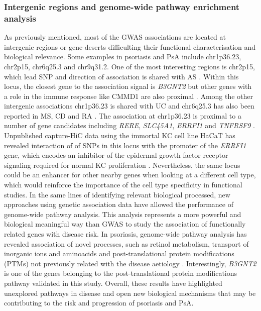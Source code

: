\subsubsection{Intergenic regions and genome-wide pathway enrichment analysis}
As previously mentioned, most of the GWAS associations are located at intergenic regions or gene deserts difficulting their functional characterisation and biological relevance. Some examples in psoriasis and PsA include chr1p36.23, chr2p15, chr6q25.3 and chr9q31.2. One of the most interesting regions is chr2p15, which lead SNP and direction of association is shared with AS \parencite{Immunobase}. Within this locus, the closest gene to the association signal is \textit{B3GNT2} but other genes with a role in the immune response like CMMD1 are also proximal \parencite{Maine2007}. Among the other intergenic associations chr1p36.23 is shared with UC and chr6q25.3 has also been reported in MS, CD and RA \parencite{Immunobase}. The association at chr1p36.23 is proximal to a number of gene candidates including \textit{RERE}, \textit{SLC45A1}, \textit{ERRFI1} and \textit{TNFRSF9} \parencite{Tsoi2012}. Unpublished capture-HiC data using the immortal KC cell line  HaCaT has revealed interaction of of SNPs in this locus with the promoter of the \textit{ERRFI1} gene, which encodes an inhibitor of the epidermal growth factor receptor signaling required for normal KC proliferation \parencite{Ray-Jones2017}. Nevertheless, the same locus could be an enhancer for other nearby genes when looking at a different cell type, which would reinforce the importance of the cell type specificity in functional studies. 
In the same lines of identifying relevant biological processed, new approaches using genetic association data have allowed the performance of genome-wide pathway analysis. This analysis represents a more powerful and biological meaningful way than GWAS to study the association of functionally related genes with disease risk. In psoriasis, genome-wide pathway analysis has revealed association of novel processes, such as retinol metabolism, transport of inorganic ions and aminoacids and post-translational protein modifications (PTMs) not previously related with the disease aetiology \parencite{Aterido2015}. Interestingly, \textit{B3GNT2} is one of the genes belonging to the post-translational protein modifications pathway validated in this study. Overall, these results have highlighted unexplored pathways in disease and open new biological mechanisms that may be contributing to the risk and progression of psoriasis and PsA. 
  
